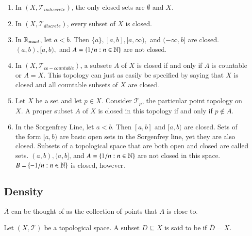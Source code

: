 \documentclass[12pt, a4paper, oneside, openright, titlepage]{book}
\begin{document}
\begin{example}
    \leavevmode
    \begin{enumerate}
        \item In $(X,\mathcal{T}_{indiscrete})$, the only closed sets are $\emptyset$ and $X$.
        \item In $(X,\mathcal{T}_{discrete})$, every subset of $X$ is closed.
        \item In $\mathbb R_{usual}$, let $a<b$. Then $\{a\}, [a,b],[a,\infty),$ and $(-\infty,b]$ are closed. $(a,b), [a,b),$ and $A = \{1/n:n \in \mathbb N\}$ are not closed.
        \item In $(X,\mathcal{T}_{co-countable})$, a subsete $A$ of $X$ is closed if and only if $A$ is countable or $A = X$. This topology can just as easily be specified by saying that $X$ is closed and all countable subsets of $X$ are closed.
        \item Let $X$ be a set and let $p \in X$. Consider $\mathcal{T}_p$, the particular point topology on $X$. A proper subset $A$ of $X$ is closed in this topology if and only if $p \notin A$.
        \item In the Sorgenfrey Line, let $a < b$. Then $[a,b]$ and $[a,b)$ are closed. Sets of the form $[a,b)$ are basic open sets in the Sorgenfrey line, yet they are also closed. Subsets of a topological space that are both open and closed are called  sets. $(a,b),(a,b]$, and $A = \{1/n:n\in\mathbb N\}$ are not closed in this space. $B = \{-1/n:n \in\mathbb N\}$ is closed, however.
    \end{enumerate}
\end{example}


\subsection{Density}


\begin{remark}
    $\overline{A}$ can be thought of as the collection of points that $A$ is close to.
\end{remark}


\begin{definition}
    Let $(X,\mathcal{T})$ be a topological space. A subset $D\subseteq X$ is said to be  if $\overline{D} = X$.
\end{definition}
\end{document}
